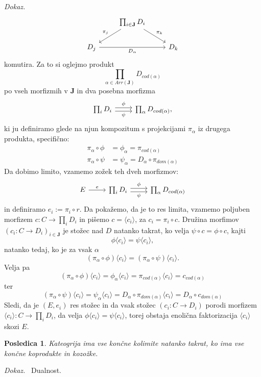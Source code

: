 \documentclass[12pt,a4paper]{book}
\theoremstyle{definition}
\theoremstyle{plain}
\newtheorem{posledica}{Posledica}[definicija]
\newenvironment{dokaz}{\emph{Dokaz.}\ }{\hspace{\fill}{$\Box$}}
\theoremstyle{definition}
\theoremstyle{remark}
\newcommand{\cat}[1]{\textbf{#1}}
\begin{document}
\begin{dokaz}
$$ \begin{tikzcd}
& \prod_{i \in \cat{J}}D_i \ar[dl, "\pi_j"'] \ar[dr, "\pi_k"] & \\
D_j \ar[rr, "D_\alpha"'] && D_k
\end{tikzcd} $$
komutira. Za to si oglejmo produkt
$$ \prod_{\alpha \in Arr(\cat{J})} D_{cod(\alpha)} $$
po vseh morfizmih v $\cat{J}$ in dva posebna morfizma
$$ \begin{tikzcd}[sep=normal]
\prod_{i }D_i \ar[r, shift left, "\phi"] \ar[r, shift right, "\psi"'] & \prod_{\alpha } D_{cod(\alpha)},
\end{tikzcd} $$
ki ju definiramo glede na njun kompozitum s projekcijami $\pi_\alpha$ iz drugega produkta, specifično:
\begin{align*}
\pi_\alpha \circ \phi &= \phi_\alpha = \pi_{cod(\alpha)} \\
\pi_\alpha \circ \psi &= \psi_\alpha = D_\alpha \circ \pi_{dom(\alpha)}
\end{align*}
Da dobimo limito, vzamemo zožek teh dveh morfizmov:
$$ \begin{tikzcd}[sep=normal]
E \ar[r, "e"] & \prod_{i }D_i \ar[r, shift left, "\phi"] \ar[r, shift right, "\psi"'] & \prod_{\alpha } D_{cod(\alpha)}
\end{tikzcd} $$
in definiramo $e_i := \pi_i \circ r$. Da pokažemo, da je to res limita, vzamemo poljuben morfizem $c : C \to \prod_i D_i$ in pišemo $c = \langle c_i \rangle$, za $c_i = \pi_i \circ c$. Družina morfimov $(c_i : C \to D_i)_{i \in \cat{J}}$ je stožec nad $D$ natanko takrat, ko velja $\psi \circ c = \phi \circ c$, kajti
$$\phi \langle c_i \rangle = \psi \langle c_i \rangle,$$
natanko tedaj, ko je za vsak $\alpha$
$$(\pi_\alpha \circ \phi) \langle c_i \rangle = (\pi_\alpha \circ \psi) \langle c_i \rangle.$$
Velja pa
$$(\pi_\alpha \circ \phi) \langle c_i \rangle = \phi_\alpha \langle c_i \rangle = \pi_{cod(\alpha)}\langle c_i \rangle = c_{cod(\alpha)} $$
ter
$$(\pi_\alpha \circ \psi) \langle c_i \rangle = \psi_\alpha \langle c_i \rangle  = D_\alpha \circ \pi_{dom(\alpha)} \langle c_i \rangle = D_\alpha \circ c_{dom(\alpha)} $$
Sledi, da je $(E, e_i)$ res stožec in da vsak stožec $(c_i : C \to D_i)$ porodi morfizem $\langle c_i \rangle : C \to \prod_i D_i$, da velja $\phi\langle c_i \rangle = \psi \langle c_i \rangle$, torej obstaja enolična faktorizacija $\langle c_i \rangle$ skozi $E$.

\end{dokaz}

\begin{posledica}
Kateogrija ima vse končne kolimite natanko takrat, ko ima vse končne koprodukte in kozožke.
\end{posledica}
\begin{dokaz}
Dualnost.
\end{dokaz}
\end{document}
